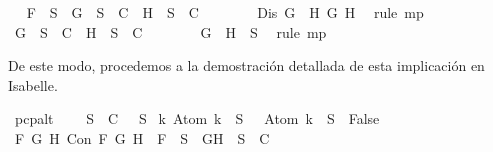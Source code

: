 \begin{isabellebody}
\ \isamarkupfalse%
\ {\isachardoublequoteopen}{\isacharquery}F\ {\isasymin}\ S\ {\isasymlongrightarrow}\ {\isacharbraceleft}\isactrlbold {\isasymnot}G{\isacharbraceright}\ {\isasymunion}\ S\ {\isasymin}\ C\ {\isasymor}\ {\isacharbraceleft}\isactrlbold {\isasymnot}H{\isacharbraceright}\ {\isasymunion}\ S\ {\isasymin}\ C{\isachardoublequoteclose}\isanewline
\ \ \ \ \ \ \isamarkupfalse%
\ {\isacartoucheopen}Dis\ {\isacharparenleft}\isactrlbold {\isasymnot}{\isacharparenleft}G\ \isactrlbold {\isasymand}\ H{\isacharparenright}{\isacharparenright}\ {\isacharparenleft}\isactrlbold {\isasymnot}G{\isacharparenright}\ {\isacharparenleft}\isactrlbold {\isasymnot}H{\isacharparenright}{\isacartoucheclose}\ \isamarkupfalse%
\ {\isacharparenleft}rule\ mp{\isacharparenright}\isanewline
\ \ \ \ \isamarkupfalse%
\ {\isachardoublequoteopen}{\isacharbraceleft}\isactrlbold {\isasymnot}G{\isacharbraceright}\ {\isasymunion}\ S\ {\isasymin}\ C\ {\isasymor}\ {\isacharbraceleft}\isactrlbold {\isasymnot}H{\isacharbraceright}\ {\isasymunion}\ S\ {\isasymin}\ C{\isachardoublequoteclose}\isanewline
\ \ \ \ \ \ \isamarkupfalse%
\ {\isacartoucheopen}\isactrlbold {\isasymnot}{\isacharparenleft}G\ \isactrlbold {\isasymand}\ H{\isacharparenright}\ {\isasymin}\ S{\isacartoucheclose}\ \isamarkupfalse%
\ {\isacharparenleft}rule\ mp{\isacharparenright}\isanewline
\ \ \isamarkupfalse%
\isanewline
{}\isamarkupfalse%
%
\endisatagproof
{\isafoldproof}%
%
\isadelimproof
%
\endisadelimproof
%
\begin{isamarkuptext}%
De este modo, procedemos a la demostración detallada de esta implicación en Isabelle.%
\end{isamarkuptext}\isamarkuptrue%
\isamarkupfalse%
\ pcp{\isacharunderscore}alt{}{\isacharcolon}\ \isanewline
\ \ \ {\isachardoublequoteopen}{\isasymforall}S\ {\isasymin}\ C{\isachardot}\ {\isasymbottom}\ {\isasymnotin}\ S\isanewline
{\isasymand}\ {\isacharparenleft}{\isasymforall}k{\isachardot}\ Atom\ k\ {\isasymin}\ S\ {\isasymlongrightarrow}\ \isactrlbold {\isasymnot}\ {\isacharparenleft}Atom\ k{\isacharparenright}\ {\isasymin}\ S\ {\isasymlongrightarrow}\ False{\isacharparenright}\isanewline
{\isasymand}\ {\isacharparenleft}{\isasymforall}F\ G\ H{\isachardot}\ Con\ F\ G\ H\ {\isasymlongrightarrow}\ F\ {\isasymin}\ S\ {\isasymlongrightarrow}\ {\isacharbraceleft}G{\isacharcomma}H{\isacharbraceright}\ {\isasymunion}\ S\ {\isasymin}\ C{\isacharparenright}\isanewline

\end{isabellebody}
